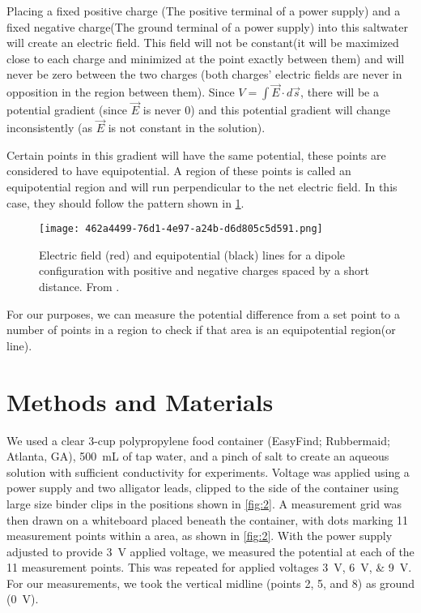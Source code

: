 ﻿\documentclass[10pt,journal,twoside]{IEEEtran}
\begin{document}
Placing a fixed positive charge (The positive terminal of a power supply) and a fixed negative charge(The ground terminal of a power supply) into this saltwater will create an electric field. This field will not be constant(it will be maximized close to each charge and minimized at the point exactly between them) and will never be zero between the two charges (both charges' electric fields are never in opposition in the region between them). Since $V=\int\vec{E}\cdot d\vec{s}$, there will be a potential gradient (since $\vec{E}$ is never 0) and this potential gradient will change inconsistently (as $\vec{E}$ is not constant in the solution). 

Certain points in this gradient will have the same potential, these points are considered to have equipotential. A region of these points is called an equipotential region and will run perpendicular to the net electric field. In this case, they should follow the pattern shown in \cref{fig:1}.
\begin{figure}
\begin{center}
\texttt{[image: 462a4499-76d1-4e97-a24b-d6d805c5d591.png]}
\end{center}
\caption{Electric field (red) and equipotential (black) lines for a dipole configuration with positive and negative charges spaced by a short distance. From \cite{ling-2016-university}.}
\label{fig:1}
\end{figure}
For our purposes, we can measure the potential difference from a set point to a number of points in a region to check if that area is an equipotential region(or line).










\section{Methods and Materials}

We used a clear 3-cup polypropylene food container (EasyFind; Rubbermaid; Atlanta, GA), \qty{500}{\milli\liter} of tap water, and a pinch of salt to create an aqueous solution with sufficient conductivity for experiments. Voltage was applied using a power supply and two alligator leads, clipped to the side of the container using large size binder clips in the positions shown in \cref{fig:2}. A  measurement grid was then drawn on a whiteboard placed beneath the container, with dots marking 11 measurement points within a  area, as shown in \cref{fig:2}. With the power supply adjusted to provide \qty{3}{\volt} applied voltage, we measured the potential at each of the 11 measurement points. This was repeated for applied voltages \qtylist{3;6;9}{\volt}. For our measurements, we took the vertical midline (points 2, 5, and 8) as ground (\qty{0}{\volt}). 
\end{document}

